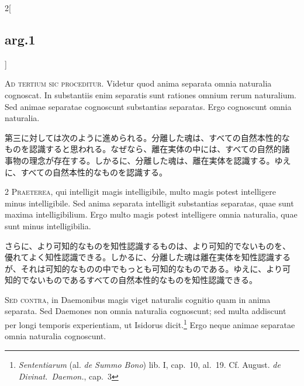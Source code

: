 \documentclass[paper=a4paper,fontsize=10pt,jafontsize=9pt,titlepage]{jlreq}
\begin{document}
\begin{paracol}{2}[\subsection{arg.1}]

{\huge A}{\scshape d tertium sic proceditur}. Videtur quod anima separata
omnia naturalia cognoscat. In substantiis enim separatis sunt rationes
omnium rerum naturalium. Sed animae separatae cognoscunt substantias
separatas. Ergo cognoscunt omnia naturalia.

\switchcolumn

第三に対しては次のように進められる。分離した魂は、すべての自然本性的な
ものを認識すると思われる。なぜなら、離在実体の中には、すべての自然的諸
事物の理念が存在する。しかるに、分離した魂は、離在実体を認識する。ゆえ
に、すべての自然本性的なものを認識する。

\switchcolumn*

2 {\scshape Praeterea}, qui intelligit magis intelligibile, multo magis
potest intelligere minus intelligibile. Sed anima separata intelligit
substantias separatas, quae sunt maxima intelligibilium. Ergo multo
magis potest intelligere omnia naturalia, quae sunt minus
intelligibilia.

\switchcolumn

さらに、より可知的なものを知性認識するものは、より可知的でないものを、
優れてよく知性認識できる。しかるに、分離した魂は離在実体を知性認識する
が、それは可知的なものの中でもっとも可知的なものである。ゆえに、より可
知的でないものであるすべての自然本性的なものを知性認識できる。

\switchcolumn*[\subsection{s.c.}]

{\scshape Sed contra}, in Daemonibus magis viget
naturalis cognitio quam in anima separata. Sed Daemones non omnia
naturalia cognoscunt; sed multa addiscunt per longi temporis
experientiam, ut Isidorus dicit.\footnote{{\itshape Sententiarum} (al. {\itshape
de Summo Bono}) lib. I, cap.~10, al.~19. Cf. August. {\itshape de
Divinat.~Daemon.}, cap.~3} Ergo neque animae separatae omnia naturalia
cognoscunt.


\end{paracol}
\end{document}
